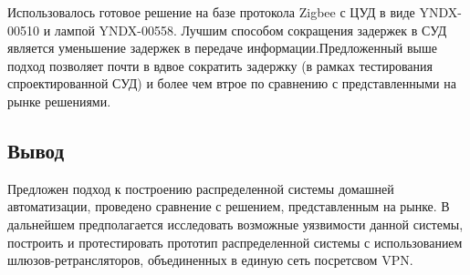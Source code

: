 \documentclass[a4paper,12pt]{article}
\begin{document}
Использовалось готовое решение на базе протокола Zigbee с ЦУД в виде YNDX-00510 \cite{YNDX_hub} и
лампой YNDX-00558. Лучшим способом сокращения задержек в СУД является уменьшение задержек в передаче
информации.Предложенный выше подход позволяет почти в вдвое сократить задержку (в рамках тестирования спроектированной
СУД) и более чем втрое по сравнению с представленными на рынке решениями.

\subsection{Вывод}
Предложен подход к построению распределенной системы домашней автоматизации, проведено сравнение с решением,
представленным на рынке. В дальнейшем предполагается исследовать возможные
уязвимости данной системы, построить и протестировать прототип распределенной системы с использованием шлюзов-ретрансляторов,
объединенных в единую сеть посретсвом VPN.
\end{document}
